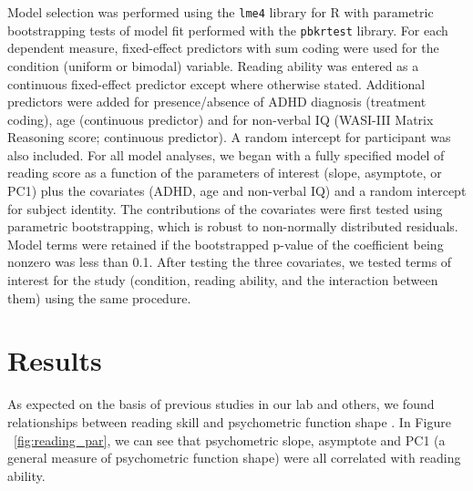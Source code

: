 \documentclass[../uwthesis.tex]{subfiles}
\begin{document}
Model selection was performed using the \texttt{lme4} library for R with parametric bootstrapping tests of model fit performed with the \texttt{pbkrtest} library. For each dependent measure, fixed-effect predictors with sum coding were used for the condition (uniform or bimodal) variable. Reading ability was entered as a continuous fixed-effect predictor except where otherwise stated. Additional predictors were added for presence/absence of ADHD diagnosis (treatment coding), age (continuous predictor) and for non-verbal IQ (WASI-III Matrix Reasoning score; continuous predictor). A random intercept for participant was also included. For all model analyses, we began with a fully specified model of reading score as a function of the parameters of interest (slope, asymptote, or PC1) plus the covariates (ADHD, age and non-verbal IQ) and a random intercept for subject identity. The contributions of the covariates were first tested using parametric bootstrapping, which is robust to non-normally distributed residuals. Model terms were retained if the bootstrapped p-value of the coefficient being nonzero was less than 0.1. After testing the three covariates, we tested terms of interest for the study (condition, reading ability, and the interaction between them) using the same procedure.

\section{Results}
 
 As expected on the basis of previous studies in our lab and others, we found relationships between reading skill and psychometric function shape \citep{OBrien2018,OBrien2019CategoricalDuration,Vandermosten2010,Noordenbos2015}. In Figure ~\ref{fig:reading_par}, we can see that psychometric slope, asymptote and PC1 (a general measure of psychometric function shape) were all correlated with reading ability. 
 
\end{document}
